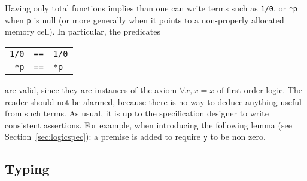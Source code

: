 Having only total functions implies than one can write
terms such as \lstinline|1/0|, or \lstinline|*p| when \lstinline!p! is
null (or more
generally
when it points to a non-properly allocated memory cell). In
particular, the predicates
\begin{tabular}{rcl}
  \lstinline!1/0! &\lstinline|==|& \lstinline!1/0! \\\relax
  \lstinline!*p! &\lstinline|==|& \lstinline!*p!
\end{tabular}
are valid, since they are instances of the axiom $\forall x,
x=x$ of first-order logic. The reader should not be alarmed, because
there is no way to deduce anything useful from such terms.
As usual, it is up to the specification designer to write
consistent assertions. For example, when introducing the following lemma
(see Section~\ref{sec:logicspec}):
a premise is added to require \lstinline|y| to be non zero.


\subsection{Typing}\label{sec:typing}

